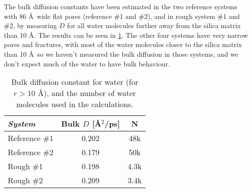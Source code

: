 

The bulk diffusion constants have been estimated in the two reference systems with 86 \AA\ wide flat pores (reference \#1 and \#2), and in rough system \#1 and \#2, by measuring $D$ for all water molecules further away from the silica matrix than 10 \AA. The results can be seen in \cref{tab:bulk_water_diffusion}. The other four systems have very narrow pores and fractures, with most of the water molecules closer to the silica matrix than 10 \AA\, so we haven't measured the bulk diffusion in those systems, and we don't expect much of the water to have bulk behaviour.
%
\begin{table}[!htb]%
    \centering%
    \begin{tabular}{l|cc}%
        \textit{System} & Bulk $D$ [\AA$^2$/ps] & N    \\\hline
        Reference \#1   & 0.202                 & 48k  \\ %
        Reference \#2   & 0.179                 & 50k  \\ %
        Rough \#1       & 0.198                 & 4.3k \\ %
        Rough \#2       & 0.209                 & 3.4k \\ %
    \end{tabular}%
    \vspace{8pt}%
    \caption{%
        Bulk diffusion constant for water (for $r>10$ \AA), and the number of water molecules used in the calculations. %
        \label{tab:bulk_water_diffusion}%
    }%
\end{table}

